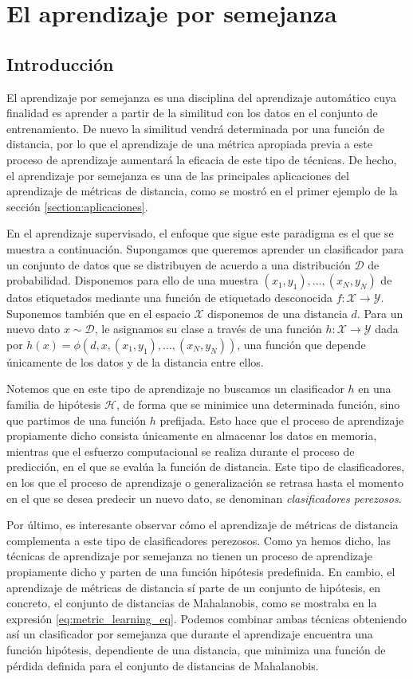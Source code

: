 \documentclass{book}
\begin{document}
\section{El aprendizaje por semejanza}

\subsection{Introducción}

El aprendizaje por semejanza es una disciplina del aprendizaje automático cuya finalidad es aprender a partir de la similitud con los datos en el conjunto de entrenamiento. De nuevo la similitud vendrá determinada por una función de distancia, por lo que el aprendizaje de una métrica apropiada previa a este proceso de aprendizaje aumentará la eficacia de este tipo de técnicas. De hecho, el aprendizaje por semejanza es una de las principales aplicaciones del aprendizaje de métricas de distancia, como se mostró en el primer ejemplo de la sección \ref{section:aplicaciones}.

En el aprendizaje supervisado, el enfoque que sigue este paradigma es el que se muestra a continuación. Supongamos que queremos aprender un clasificador para un conjunto de datos que se distribuyen de acuerdo a una distribución $\mathcal{D}$ de probabilidad. Disponemos para ello de una muestra $(x_1,y_1),\dots,(x_N,y_N)$ de datos etiquetados mediante una función de etiquetado desconocida $f\colon \mathcal{X} \to \mathcal{Y}$. Suponemos también que en el espacio $\mathcal{X}$ disponemos de una distancia $d$. Para un nuevo dato $x \sim \mathcal{D}$, le asignamos su clase a través de una función $h \colon \mathcal{X} \to \mathcal{Y}$ dada por $h(x) = \phi(d,x,(x_1,y_1),\dots,(x_N,y_N))$, una función que depende únicamente de los datos y de la distancia entre ellos.

Notemos que en este tipo de aprendizaje no buscamos un clasificador $h$ en una familia de hipótesis $\mathcal{H}$, de forma que se minimice una determinada función, sino que partimos de una función $h$ prefijada. Esto hace que el proceso de aprendizaje propiamente dicho consista únicamente en almacenar los datos en memoria, mientras que el esfuerzo computacional se realiza durante el proceso de predicción, en el que se evalúa la función de distancia. Este tipo de clasificadores, en los que el proceso de aprendizaje o generalización se retrasa hasta el momento en el que se desea predecir un nuevo dato, se denominan \emph{clasificadores perezosos}.

Por último, es interesante observar cómo el aprendizaje de métricas de distancia complementa a este tipo de clasificadores perezosos. Como ya hemos dicho, las técnicas de aprendizaje por semejanza no tienen un proceso de aprendizaje propiamente dicho y parten de una función hipótesis predefinida. En cambio, el aprendizaje de métricas de distancia sí parte de un conjunto de hipótesis, en concreto, el conjunto de distancias de Mahalanobis, como se mostraba en la expresión \ref{eq:metric_learning_eq}. Podemos combinar ambas técnicas obteniendo así un clasificador por semejanza que durante el aprendizaje encuentra una función hipótesis, dependiente de una distancia, que minimiza una función de pérdida definida para el conjunto de distancias de Mahalanobis.
\end{document}
